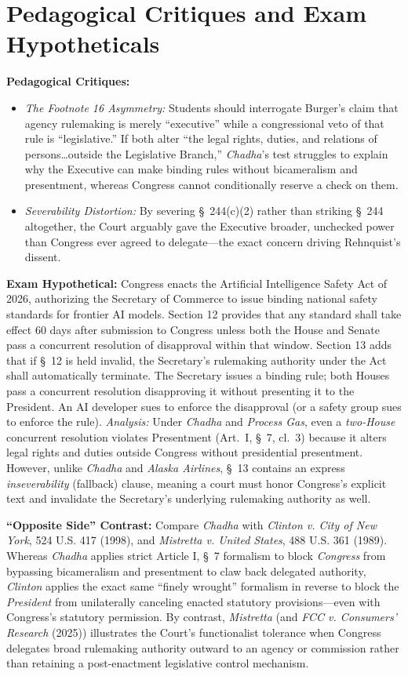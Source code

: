 \documentclass[12pt]{article}
\begin{document}
\section{Pedagogical Critiques and Exam Hypotheticals}
\textbf{Pedagogical Critiques:}
\begin{itemize}
  \item \textit{The Footnote 16 Asymmetry:} Students should interrogate Burger's claim that agency rulemaking is merely ``executive'' while a congressional veto of that rule is ``legislative.'' If both alter ``the legal rights, duties, and relations of persons\ldots outside the Legislative Branch,'' \textit{Chadha}'s test struggles to explain why the Executive can make binding rules without bicameralism and presentment, whereas Congress cannot conditionally reserve a check on them.
  \item \textit{Severability Distortion:} By severing \S~244(c)(2) rather than striking \S~244 altogether, the Court arguably gave the Executive broader, unchecked power than Congress ever agreed to delegate---the exact concern driving Rehnquist's dissent.
\end{itemize}

\textbf{Exam Hypothetical:} Congress enacts the Artificial Intelligence Safety Act of 2026, authorizing the Secretary of Commerce to issue binding national safety standards for frontier AI models. Section 12 provides that any standard shall take effect 60 days after submission to Congress unless both the House and Senate pass a concurrent resolution of disapproval within that window. Section 13 adds that if \S~12 is held invalid, the Secretary's rulemaking authority under the Act shall automatically terminate. The Secretary issues a binding rule; both Houses pass a concurrent resolution disapproving it without presenting it to the President. An AI developer sues to enforce the disapproval (or a safety group sues to enforce the rule). \textit{Analysis:} Under \textit{Chadha} and \textit{Process Gas}, even a \emph{two-House} concurrent resolution violates Presentment (Art.~I, \S~7, cl.~3) because it alters legal rights and duties outside Congress without presidential presentment. However, unlike \textit{Chadha} and \textit{Alaska Airlines}, \S~13 contains an express \emph{inseverability} (fallback) clause, meaning a court must honor Congress's explicit text and invalidate the Secretary's underlying rulemaking authority as well.

\textbf{``Opposite Side'' Contrast:} Compare \textit{Chadha} with \textit{Clinton v. City of New York}, 524 U.S. 417 (1998), and \textit{Mistretta v. United States}, 488 U.S. 361 (1989). Whereas \textit{Chadha} applies strict Article I, \S~7 formalism to block \emph{Congress} from bypassing bicameralism and presentment to claw back delegated authority, \textit{Clinton} applies the exact same ``finely wrought'' formalism in reverse to block the \emph{President} from unilaterally canceling enacted statutory provisions---even with Congress's statutory permission. By contrast, \textit{Mistretta} (and \textit{FCC v. Consumers' Research} (2025)) illustrates the Court's functionalist tolerance when Congress delegates broad rulemaking authority outward to an agency or commission rather than retaining a post-enactment legislative control mechanism.
\end{document}
